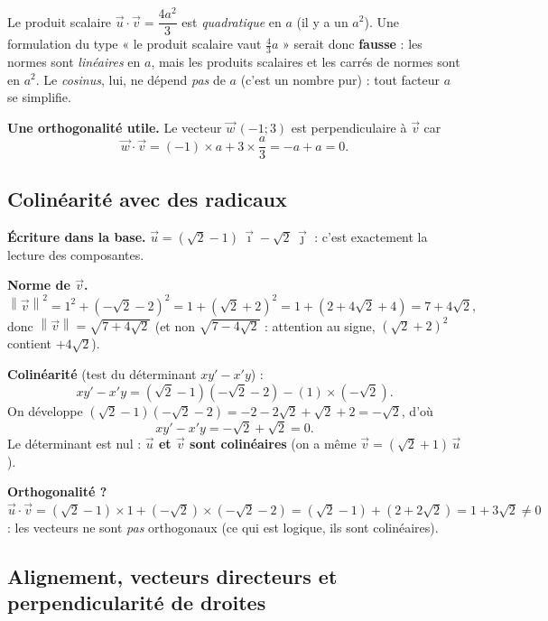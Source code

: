 \documentclass[11pt,a4paper]{article}
\providecommand{\norm}[1]{\left\lVert #1\right\rVert}
\begin{document}
\begin{exemple}
\begin{attention}[le piège « $a$ ou $a^2$ »]
Le produit scalaire $\vec u\cdot\vec v=\dfrac{4a^2}{3}$ est \emph{quadratique} en $a$ (il y a un $a^2$).
Une formulation du type « le produit scalaire vaut $\tfrac{4}{3}a$ » serait donc \textbf{fausse} : les
normes sont \emph{linéaires} en $a$, mais les produits scalaires et les carrés de normes sont en $a^2$.
Le \emph{cosinus}, lui, ne dépend \emph{pas} de $a$ (c'est un nombre pur) : tout facteur $a$ se simplifie.
\end{attention}

\textbf{Une orthogonalité utile.} Le vecteur $\vec w\,(-1;3)$ est perpendiculaire à $\vec v$ car
\[
  \vec w\cdot\vec v=(-1)\times a+3\times\frac{a}{3}=-a+a=0.
\]
\end{exemple}

\subsection{Colinéarité avec des radicaux}

\begin{exemple}
\textbf{Écriture dans la base.} $\vec u=(\sqrt2-1)\,\vec{\imath}-\sqrt2\,\vec{\jmath}$ : c'est exactement la
lecture des composantes.

\textbf{Norme de $\vec v$.}
\[
  \norm{\vec v}^2=1^2+(-\sqrt2-2)^2=1+(\sqrt2+2)^2=1+(2+4\sqrt2+4)=7+4\sqrt2,
\]
donc $\norm{\vec v}=\sqrt{7+4\sqrt2}$ (et non $\sqrt{7-4\sqrt2}$ : attention au signe, $(\sqrt2+2)^2$
contient $+4\sqrt2$).

\textbf{Colinéarité} (test du déterminant $xy'-x'y$) :
\[
  xy'-x'y=(\sqrt2-1)(-\sqrt2-2)-(1)\times(-\sqrt2).
\]
On développe $(\sqrt2-1)(-\sqrt2-2)=-2-2\sqrt2+\sqrt2+2=-\sqrt2$, d'où
\[
  xy'-x'y=-\sqrt2+\sqrt2=0.
\]
Le déterminant est nul : \textbf{$\vec u$ et $\vec v$ sont colinéaires} (on a même $\vec v=(\sqrt2+1)\,\vec u$).

\textbf{Orthogonalité ?}
$\vec u\cdot\vec v=(\sqrt2-1)\times1+(-\sqrt2)\times(-\sqrt2-2)=(\sqrt2-1)+(2+2\sqrt2)=1+3\sqrt2\neq0$ :
les vecteurs ne sont \emph{pas} orthogonaux (ce qui est logique, ils sont colinéaires).
\end{exemple}

\subsection{Alignement, vecteurs directeurs et perpendicularité de droites}
\end{document}
